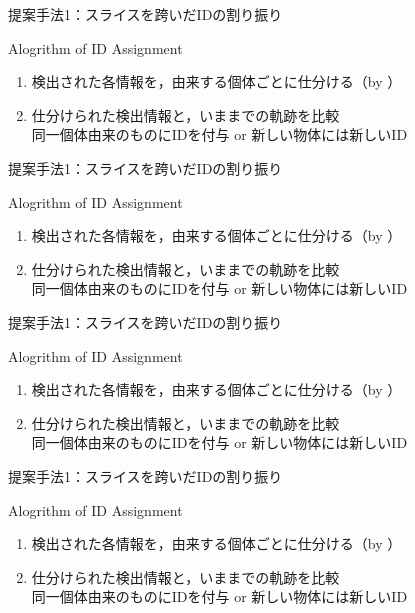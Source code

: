 \begin{frame}[noframenumbering]{提案手法1：スライスを跨いだIDの割り振り}
    \begin{block}{Alogrithm of ID Assignment}
        \begin{enumerate}
            \item 検出された各情報を，由来する個体ごとに仕分ける（by \textbf{}）
            \item 仕分けられた検出情報と，いままでの軌跡を比較 
            \\\ra 同一個体由来のものにIDを付与 or 新しい物体には新しいID
        \end{enumerate}
    \end{block}
\end{frame}
\begin{frame}[noframenumbering]{提案手法1：スライスを跨いだIDの割り振り}
    \begin{block}{Alogrithm of ID Assignment}
        \begin{enumerate}
            \item 検出された各情報を，由来する個体ごとに仕分ける（by \textbf{}）
            \item 仕分けられた検出情報と，いままでの軌跡を比較 
            \\\ra 同一個体由来のものにIDを付与 or 新しい物体には新しいID
        \end{enumerate}
    \end{block}
\end{frame}
\begin{frame}[noframenumbering]{提案手法1：スライスを跨いだIDの割り振り}
    \begin{block}{Alogrithm of ID Assignment}
        \begin{enumerate}
            \item 検出された各情報を，由来する個体ごとに仕分ける（by \textbf{}）
            \item 仕分けられた検出情報と，いままでの軌跡を比較 
            \\\ra 同一個体由来のものにIDを付与 or 新しい物体には新しいID
        \end{enumerate}
    \end{block}
\end{frame}
\begin{frame}[noframenumbering]{提案手法1：スライスを跨いだIDの割り振り}
    \begin{block}{Alogrithm of ID Assignment}
        \begin{enumerate}
            \item 検出された各情報を，由来する個体ごとに仕分ける（by \textbf{}）
            \item 仕分けられた検出情報と，いままでの軌跡を比較 
            \\\ra 同一個体由来のものにIDを付与 or 新しい物体には新しいID
        \end{enumerate}
    \end{block}
\end{frame}
